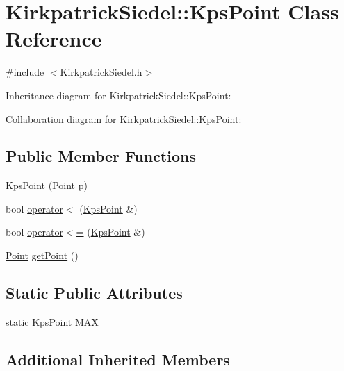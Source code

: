 \hypertarget{class_kirkpatrick_siedel_1_1_kps_point}{}\section{Kirkpatrick\+Siedel\+::Kps\+Point Class Reference}
\label{class_kirkpatrick_siedel_1_1_kps_point}


{\ttfamily \#include $<$Kirkpatrick\+Siedel.\+h$>$}



Inheritance diagram for Kirkpatrick\+Siedel\+::Kps\+Point\+:


Collaboration diagram for Kirkpatrick\+Siedel\+::Kps\+Point\+:
\subsection*{Public Member Functions}
\begin{DoxyCompactItemize}
\item 
\mbox{\hyperlink{class_kirkpatrick_siedel_1_1_kps_point_aecd05e123d83d6109eabec71b579eefa}{Kps\+Point}} (\mbox{\hyperlink{class_point}{Point}} p)
\item 
bool \mbox{\hyperlink{class_kirkpatrick_siedel_1_1_kps_point_a55f70fafa5a190911a53ddb88180f7de}{operator$<$}} (\mbox{\hyperlink{class_kirkpatrick_siedel_1_1_kps_point}{Kps\+Point}} \&)
\item 
bool \mbox{\hyperlink{class_kirkpatrick_siedel_1_1_kps_point_a5448f9f1fc98c21a75af28261dc5318d}{operator$<$=}} (\mbox{\hyperlink{class_kirkpatrick_siedel_1_1_kps_point}{Kps\+Point}} \&)
\item 
\mbox{\hyperlink{class_point}{Point}} \mbox{\hyperlink{class_kirkpatrick_siedel_1_1_kps_point_a01aead2dd3eddb807fe27caf90e1023c}{get\+Point}} ()
\end{DoxyCompactItemize}
\subsection*{Static Public Attributes}
\begin{DoxyCompactItemize}
\item 
static \mbox{\hyperlink{class_kirkpatrick_siedel_1_1_kps_point}{Kps\+Point}} \mbox{\hyperlink{class_kirkpatrick_siedel_1_1_kps_point_aac5fe9eb410be5c9acbe297e3d824fdc}{M\+AX}}
\end{DoxyCompactItemize}
\subsection*{Additional Inherited Members}


